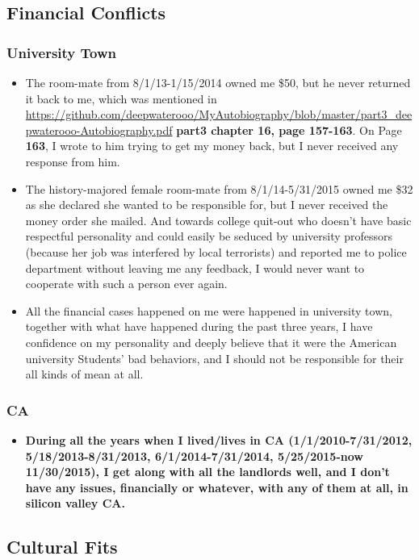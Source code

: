 \documentclass[9pt,b5paper]{article}
\begin{document}
\subsection{Financial Conflicts}
\label{sec-3-2}
\subsubsection{University Town}
\label{sec-3-2-1}
\begin{itemize}
\item The room-mate from 8/1/13-1/15/2014 owned me \$50, but he never returned it back to me, which was mentioned in \url{https://github.com/deepwaterooo/MyAutobiography/blob/master/part3_deepwaterooo-Autobiography.pdf} \textbf{part3 chapter 16, page 157-163}. On Page \textbf{163}, I wrote to him trying to get my money back, but I never received any response from him.
\item The history-majored female room-mate from 8/1/14-5/31/2015 owned me \$32 as she declared she wanted to be responsible for, but I never received the money order she mailed. And towards college quit-out who doesn't have basic respectful personality and could easily be seduced by university professors (because her job was interfered by local terrorists) and reported me to police department without leaving me any feedback, I would never want to cooperate with such a person ever again.
\item All the financial cases happened on me were happened in university town, together with what have happened during the past three years, I have confidence on my personality and deeply believe that it were the American university Students' bad behaviors, and I should not be responsible for their all kinds of mean at all.
\end{itemize}
\subsubsection{CA}
\label{sec-3-2-2}
\begin{itemize}
\item \textbf{During all the years when I lived/lives in CA (1/1/2010-7/31/2012, 5/18/2013-8/31/2013, 6/1/2014-7/31/2014, 5/25/2015-now 11/30/2015), I get along with all the landlords well, and I don't have any issues, financially or whatever, with any of them at all, in silicon valley CA.}
\end{itemize}
\subsection{Cultural Fits}
\label{sec-3-3}
\end{document}
